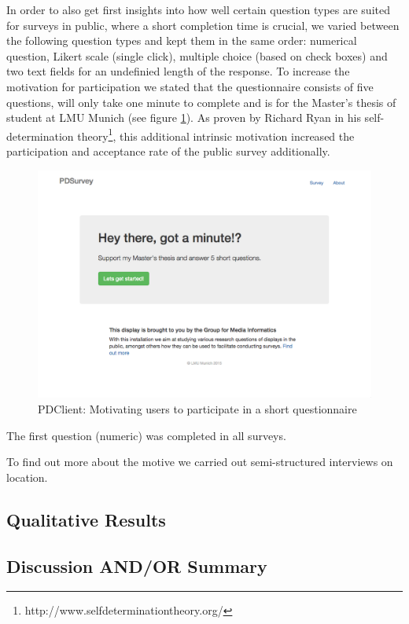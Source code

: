 	In order to also get first insights into how well certain question types are suited for surveys in public, where a short completion time is crucial, we varied between the following question types and kept them in the same order: numerical question, Likert scale (single click), multiple choice (based on check boxes) and two text fields for an undefinied length of the response. To increase the motivation for participation we stated that the questionnaire consists of five questions, will only take one minute to complete and is for the Master's thesis of student at LMU Munich (see figure \ref{fig:5-pdclient-intro}).
	As proven by Richard Ryan in his self-determination theory\cite{ryan2000self}\footnote{http://www.selfdeterminationtheory.org/}, this additional intrinsic motivation increased the participation and acceptance rate of the public survey additionally. 

	\begin{figure}
	    \begin{center}
	        \includegraphics[width=.7\columnwidth]{img/5_field-study/pdclient-startscreen.png}
	    \end{center}
	 \caption{PDClient: Motivating users to participate in a short questionnaire}
	 \label{fig:5-pdclient-intro}
	\end{figure}

	The first question (numeric) was completed in all surveys. 

	To find out more about the motive we carried out semi-structured interviews on location.


\subsection{Qualitative Results}




\subsection{Discussion AND/OR Summary}

